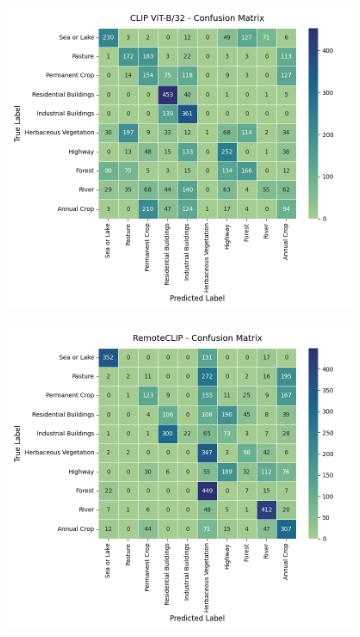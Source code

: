 \documentclass[a4paper, oneside, english]{sapthesis}
\begin{document}
\begin{figure}[h]
  \begin{subfigure}[t]{.5\textwidth}
    \centering
    \includegraphics[width=\linewidth]{img/EuroSAT_CLIP_32_cm.png}
  \end{subfigure}
  \hfill
  \begin{subfigure}[t]{.5\textwidth}
    \centering
    \includegraphics[width=\linewidth]{img/EuroSAT_RemoteCLIP_32_cm.png}
  \end{subfigure}


\end{figure}
\end{document}
